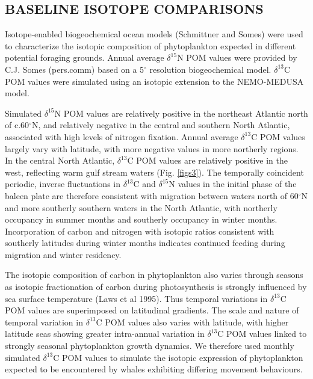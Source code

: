 \documentclass[a4paper,12pt]{article}
\begin{document}
 
 
\subsection*{BASELINE ISOTOPE COMPARISONS}
Isotope-enabled biogeochemical ocean models\cite{magozzi2017using} (Schmittner and Somes) were used to characterize the isotopic composition of phytoplankton expected in different potential foraging grounds. 
Annual average $\delta^{15}$N POM values were provided by C.J. Somes (pers.comm) based on a 5$^{\circ}$ resolution biogeochemical model. 
$\delta^{13}$C POM values were simulated using an isotopic extension to the NEMO-MEDUSA model\cite{magozzi2017using}.
 
Simulated $\delta^{15}$N POM values are relatively positive in the northeast Atlantic north of c.60$^{\circ}$N, and relatively negative in the central and southern North Atlantic, associated with high levels of nitrogen fixation. 
Annual average $\delta^{13}$C POM values largely vary with latitude, with more negative values in more northerly regions. 
In the central North Atlantic, $\delta^{13}$C POM values are relatively positive in the west, reflecting warm gulf stream waters (Fig. \ref{figs3}). 
The temporally coincident periodic, inverse fluctuations in $\delta^{13}$C and $\delta^{15}$N values in the initial phase of the baleen plate are therefore consistent with migration between waters north of 60$^{\circ}$N and more southerly southern waters in the North Atlantic, with northerly occupancy in summer months and southerly occupancy in winter months. 
Incorporation of carbon and nitrogen with isotopic ratios consistent with southerly latitudes during winter months indicates continued feeding during migration and winter residency.
 
 
The isotopic composition of carbon in phytoplankton also varies through seasons as isotopic fractionation of carbon during photosynthesis is strongly influenced by sea surface temperature (Laws et al 1995). 
Thus temporal variations in $\delta^{13}$C POM values are superimposed on latitudinal gradients. 
The scale and nature of temporal variation in $\delta^{13}$C POM values also varies with latitude, with higher latitude seas showing greater intra-annual variation in $\delta^{13}$C POM values linked to strongly seasonal phytoplankton growth dynamics. 
We therefore used monthly simulated $\delta^{13}$C POM values to simulate the isotopic expression of phytoplankton expected to be encountered by whales exhibiting differing movement behaviours.
 
\end{document}
